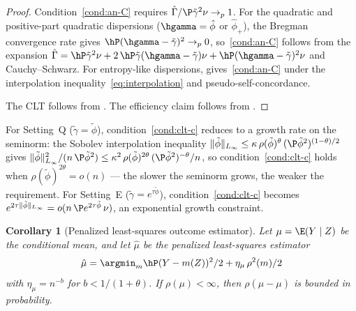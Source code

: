 \documentclass{article}
\newtheorem{corollary}[theorem]{Corollary}
\begin{document}
\begin{proof}
Condition~\ref{cond:an-C}
requires
$\hat\Gamma / \P\tilde\gamma^2\nu \to_p 1$.
For the quadratic and positive-part
quadratic dispersions ($\hgamma = \hat\phi$
or $\hat\phi_+$),
the Bregman convergence rate
gives $\hP(\hgamma - \tilde\gamma)^2 \to_p 0$,
so~\ref{cond:an-C} follows from
the expansion
$\hat\Gamma
  = \hP\tilde\gamma^2\nu
  + 2\,\hP\tilde\gamma(\hgamma - \tilde\gamma)\nu
  + \hP(\hgamma - \tilde\gamma)^2\nu$
and Cauchy--Schwarz.
For entropy-like dispersions,
gives~\ref{cond:an-C}
under the interpolation inequality~\eqref{eq:interpolation}
and pseudo-self-concordance.

The CLT follows from
.
The efficiency claim follows from
.
\end{proof}

For Setting~Q
($\tilde\gamma = \tilde\phi$),
condition~\ref{cond:clt-c} reduces to a growth rate
on the seminorm:
the Sobolev interpolation inequality
$\|\tilde\phi\|_{L_\infty}
  \le \kappa\,\rho(\tilde\phi)^\theta\,
    (\P\tilde\phi^2)^{(1-\theta)/2}$
gives
$\|\tilde\phi\|_{L_\infty}^2
  / (n\,\P\tilde\phi^2)
  \le \kappa^2\,
    \rho(\tilde\phi)^{2\theta}\,
    (\P\tilde\phi^2)^{-\theta} / n$,
so condition~\ref{cond:clt-c} holds when
$\rho(\tilde\phi)^{2\theta} = o(n)$
--- the slower the seminorm grows,
the weaker the requirement.
For Setting~E
($\tilde\gamma = e^{\tau\tilde\phi}$),
condition~\ref{cond:clt-c} becomes
$e^{2\tau\|\tilde\phi\|_{L_\infty}}
  = o(n\,\P e^{2\tau\tilde\phi}\,\nu)$,
an exponential growth constraint.

\begin{corollary}[Penalized least-squares outcome estimator]
\label{cor:outcome-estimator}
Let $\mu = \E(Y \mid Z)$
be the conditional mean,
and let $\hat\mu$ be
the penalized least-squares estimator
\begin{equation}\label{eq:general-outcome}
\hat\mu
  = \argmin_{m}
    \hP (Y - m(Z))^2/2
    + \eta_\mu\, \rho^2(m)/2
\end{equation}
with $\eta_\mu = n^{-b}$
for $b < 1/(1+\theta)$.
If $\rho(\mu) < \infty$,
then $\rho(\hat\mu - \mu)$
is bounded in probability.
\end{corollary}
\end{document}
